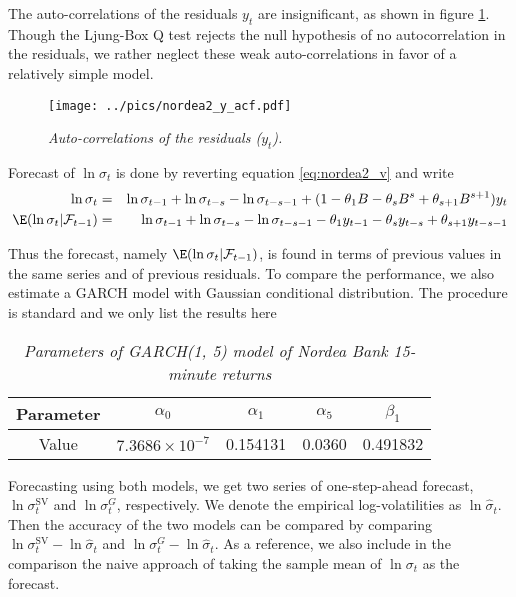 The auto-correlations of the residuals $y_t$ are insignificant, as
shown in figure \ref{fig:nordea2_y}. Though the Ljung-Box Q
test rejects the null hypothesis of no autocorrelation in the
residuals, we rather neglect these weak auto-correlations in favor of
a relatively simple model.

\begin{figure}[htb!]
  \centering
  \texttt{[image: ../pics/nordea2\_y\_acf.pdf]}
  \caption{\small \it Auto-correlations of the residuals ($y_t$).}
  \label{fig:nordea2_y}
\end{figure}

Forecast of $\ln\sigma_t$ is done by reverting equation
\ref{eq:nordea2_v} and write
\begin{eqnarray*}
  \ln\sigma_t &=& \ln\sigma_{t-1} + \ln\sigma_{t-s} -
  \ln\sigma_{t-s-1} + (1 - \theta_1 B - \theta_s B^s + \theta_{s+1}
  B^{s+1} ) y_t \\
  \E(\ln\sigma_t | \mathcal{F}_{t-1}) &=& \ln\sigma_{t-1} + \ln\sigma_{t-s} -
  \ln\sigma_{t-s-1} - \theta_1 y_{t-1} - \theta_s y_{t-s} +
  \theta_{s+1} y_{t-s-1}
\end{eqnarray*}

Thus the forecast, namely $\E(\ln\sigma_t | \mathcal{F}_{t-1})$, is
found in terms of previous values in the same series and of previous
residuals. To compare the performance, we also estimate a GARCH model with
Gaussian conditional distribution. The procedure is standard and we
only list the results here
\begin{table}[htb!]
  \centering
  \begin{tabular}{|c|c|c|c|c|}
    \hline
    Parameter & $\alpha_0$ & $\alpha_1$ & $\alpha_5$ & $\beta_1$ \\
    \hline
    Value & $7.3686 \times 10^{-7}$ & 0.154131 & 0.0360 & 0.491832 \\
    \hline
  \end{tabular}
  \caption{\small \it Parameters of GARCH(1, 5) model of Nordea
    Bank 15-minute returns}
  \label{tab:nordea2_garch}
\end{table}

Forecasting using both models, we get two series of one-step-ahead
forecast, $\ln \sigma^{\text{SV}}_t$ and $\ln \sigma^G_t$,
respectively. We denote the empirical log-volatilities as $\ln
\hat{\sigma}_t$. Then the accuracy of the two models can be compared
by comparing $\ln \sigma^{\text{SV}}_t - \ln \hat{\sigma}_t$ and
$\ln \sigma^G_t - \ln \hat{\sigma}_t$. As a reference, we also include
in the comparison the naive approach of taking the sample mean of
$\ln \sigma_t$ as the forecast.

